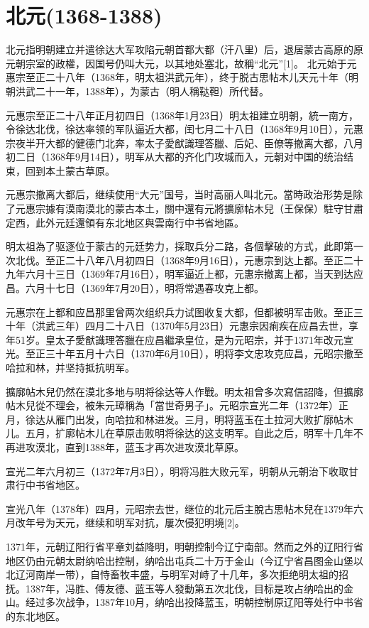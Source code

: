 
\section{北元\tiny(1368-1388)}

北元指明朝建立并遣徐达大军攻陷元朝首都大都（汗八里）后，退居蒙古高原的原元朝宗室的政權，因国号仍叫大元，以其地处塞北，故稱“北元”[1]。 北元始于元惠宗至正二十八年（1368年，明太祖洪武元年），终于脱古思帖木儿天元十年（明朝洪武二十一年，1388年），为蒙古（明人稱鞑靼）所代替。

元惠宗至正二十八年正月初四日（1368年1月23日）明太祖建立明朝，統一南方，令徐达北伐，徐达率领的军队逼近大都，闰七月二十八日（1368年9月10日），元惠宗夜半开大都的健德门北奔，率太子愛猷識理答臘、后妃、臣僚等撤离大都，八月初二日（1368年9月14日），明军从大都的齐化门攻城而入，元朝对中国的统治结束，回到本土蒙古草原。

元惠宗撤离大都后，继续使用“大元”国号，当时高丽人叫北元。當時政治形势是除了元惠宗據有漠南漠北的蒙古本土，關中還有元將擴廓帖木兒（王保保）駐守甘肅定西，此外元廷還領有东北地区與雲南行中书省地區。

明太祖為了驱逐位于蒙古的元廷势力，採取兵分二路，各個擊破的方式，此即第一次北伐。至正二十八年八月初四日（1368年9月16日），元惠宗到达上都。至正二十九年六月十三日（1369年7月16日），明军逼近上都，元惠宗撤离上都，当天到达应昌。六月十七日（1369年7月20日），明将常遇春攻克上都。

元惠宗在上都和应昌那里曾两次组织兵力试图收复大都，但都被明军击败。至正三十年（洪武三年）四月二十八日（1370年5月23日）元惠宗因痢疾在应昌去世，享年51岁。皇太子愛猷識理答臘在应昌繼承皇位，是为元昭宗，并于1371年改元宣光。至正三十年五月十六日（1370年6月10日），明将李文忠攻克应昌，元昭宗撤至哈拉和林，并坚持抵抗明军。

擴廓帖木兒仍然在漠北多地与明将徐达等人作戰。明太祖曾多次寫信詔降，但擴廓帖木兒從不理会，被朱元璋稱為「當世奇男子」。元昭宗宣光二年（1372年）正月，徐达从雁门出发，向哈拉和林进发。三月，明将蓝玉在土拉河大败扩廓帖木儿。五月，扩廓帖木儿在草原击败明将徐达的这支明军。自此之后，明军十几年不再进攻漠北，直到1388年，蓝玉才再次进攻漠北草原。

宣光二年六月初三（1372年7月3日），明将冯胜大败元军，明朝从元朝治下收取甘肃行中书省地区。

宣光八年（1378年）四月，元昭宗去世，继位的北元后主脫古思帖木兒在1379年六月改年号为天元，继续和明军对抗，屢次侵犯明境[2]。

1371年，元朝辽阳行省平章刘益降明，明朝控制今辽宁南部。然而之外的辽阳行省地区仍由元朝太尉纳哈出控制，纳哈出屯兵二十万于金山（今辽宁省昌图金山堡以北辽河南岸一带），自恃畜牧丰盛，与明军对峙了十几年，多次拒绝明太祖的招抚。1387年，冯胜、傅友德、蓝玉等人發動第五次北伐，目标是攻占纳哈出的金山。经过多次战争，1387年10月，纳哈出投降蓝玉，明朝控制原辽阳等处行中书省的东北地区。

